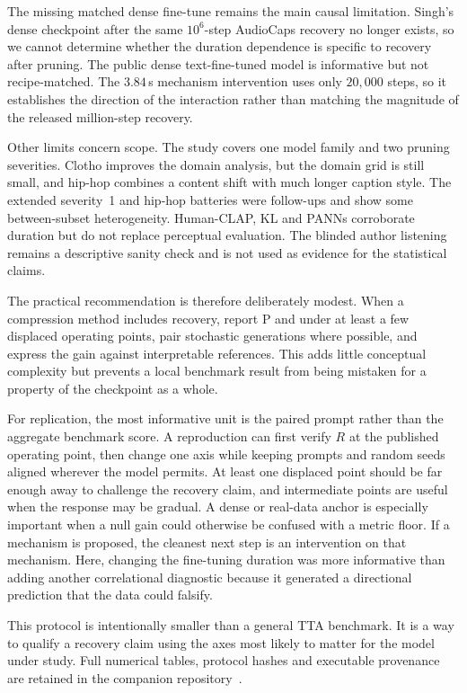 The missing matched dense fine-tune remains the main causal limitation. Singh's dense checkpoint after the same $10^{6}$-step AudioCaps recovery no longer exists, so we cannot determine whether the duration dependence is specific to recovery after pruning. The public dense text-fine-tuned model is informative but not recipe-matched. The $3.84$\,s mechanism intervention uses only $20{,}000$ steps, so it establishes the direction of the interaction rather than matching the magnitude of the released million-step recovery.

Other limits concern scope. The study covers one model family and two pruning severities. Clotho improves the domain analysis, but the domain grid is still small, and hip-hop combines a content shift with much longer caption style. The extended severity~1 and hip-hop batteries were follow-ups and show some between-subset heterogeneity. Human-CLAP, KL and PANNs corroborate duration but do not replace perceptual evaluation. The blinded author listening remains a descriptive sanity check and is not used as evidence for the statistical claims.

The practical recommendation is therefore deliberately modest. When a compression method includes recovery, report P and \PFT{} under at least a few displaced operating points, pair stochastic generations where possible, and express the gain against interpretable references. This adds little conceptual complexity but prevents a local benchmark result from being mistaken for a property of the checkpoint as a whole.

For replication, the most informative unit is the paired prompt rather than the aggregate benchmark score. A reproduction can first verify $R$ at the published operating point, then change one axis while keeping prompts and random seeds aligned wherever the model permits. At least one displaced point should be far enough away to challenge the recovery claim, and intermediate points are useful when the response may be gradual. A dense or real-data anchor is especially important when a null gain could otherwise be confused with a metric floor. If a mechanism is proposed, the cleanest next step is an intervention on that mechanism. Here, changing the fine-tuning duration was more informative than adding another correlational diagnostic because it generated a directional prediction that the data could falsify.

This protocol is intentionally smaller than a general TTA benchmark. It is a way to qualify a recovery claim using the axes most likely to matter for the model under study. Full numerical tables, protocol hashes and executable provenance are retained in the companion repository~\cite{bibbo2026repo}.

